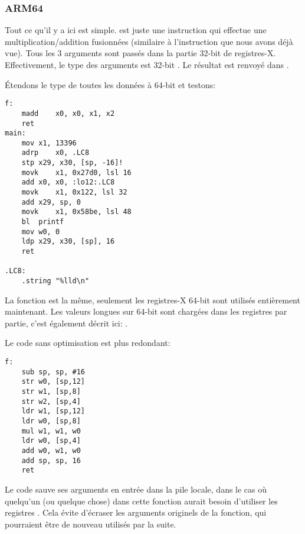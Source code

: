 \subsubsection{ARM64}


Tout ce qu'il y a ici est simple.
 est juste une instruction qui effectue une multiplication/addition fusionnées
(similaire à l'instruction  que nous avons déjà vue).
Tous les 3 arguments sont passés dans la partie 32-bit de registres-X.
Effectivement, le type des arguments est 32-bit .
Le résultat est renvoyé dans .



Étendons le type de toutes les données à 64-bit  et testons:



\begin{lstlisting}[style=customasmARM]
f:
	madd	x0, x0, x1, x2
	ret
main:
	mov	x1, 13396
	adrp	x0, .LC8
	stp	x29, x30, [sp, -16]!
	movk	x1, 0x27d0, lsl 16
	add	x0, x0, :lo12:.LC8
	movk	x1, 0x122, lsl 32
	add	x29, sp, 0
	movk	x1, 0x58be, lsl 48
	bl	printf
	mov	w0, 0
	ldp	x29, x30, [sp], 16
	ret

.LC8:
	.string	"%lld\n"
\end{lstlisting}

La fonction \ttf{} est la même, seulement les registres-X 64-bit sont utilisés entièrement
maintenant.
Les valeurs longues sur 64-bit sont chargées dans les registres par partie, c'est
également décrit ici: .


Le code sans optimisation est plus redondant:

\begin{lstlisting}[style=customasmARM]
f:
	sub	sp, sp, #16
	str	w0, [sp,12]
	str	w1, [sp,8]
	str	w2, [sp,4]
	ldr	w1, [sp,12]
	ldr	w0, [sp,8]
	mul	w1, w1, w0
	ldr	w0, [sp,4]
	add	w0, w1, w0
	add	sp, sp, 16
	ret
\end{lstlisting}

Le code sauve ses arguments en entrée dans la pile locale, dans le cas où quelqu'un
(ou quelque chose) dans cette fonction aurait besoin d'utiliser les registres .
Cela évite d'écraser les arguments originels de la fonction, qui pourraient être
de nouveau utilisés par la suite.

